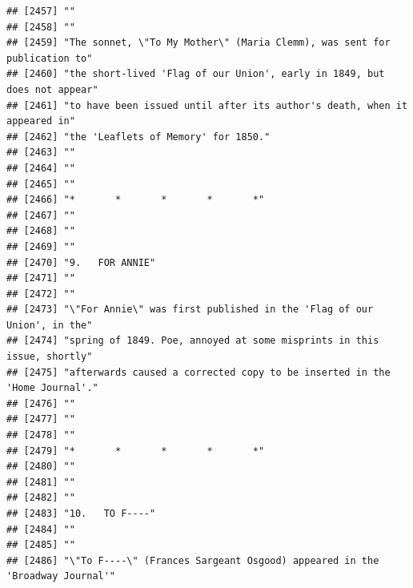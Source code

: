 \documentclass{article}\usepackage[]{graphicx}\usepackage[]{color}
\makeatletter
\newenvironment{kframe}{%
 \def\at@end@of@kframe{}%
 \ifinner\ifhmode%
  \def\at@end@of@kframe{\end{minipage}}%
  \begin{minipage}{\columnwidth}%
 \fi\fi%
 \def\FrameCommand##1{\hskip\@totalleftmargin \hskip-\fboxsep
 \colorbox{shadecolor}{##1}\hskip-\fboxsep
     \hskip-\linewidth \hskip-\@totalleftmargin \hskip\columnwidth}%
 \MakeFramed {\advance\hsize-\width
   \@totalleftmargin\z@ \linewidth\hsize
   \@setminipage}}%
 {\par\unskip\endMakeFramed%
 \at@end@of@kframe}
\newenvironment{knitrout}{}{} %
\makeatother
\begin{document}
\begin{knitrout}
\begin{kframe}
\begin{verbatim}
## [2457] ""                                                                            
## [2458] ""                                                                            
## [2459] "The sonnet, \"To My Mother\" (Maria Clemm), was sent for publication to"     
## [2460] "the short-lived 'Flag of our Union', early in 1849, but does not appear"     
## [2461] "to have been issued until after its author's death, when it appeared in"     
## [2462] "the 'Leaflets of Memory' for 1850."                                          
## [2463] ""                                                                            
## [2464] ""                                                                            
## [2465] ""                                                                            
## [2466] "*       *       *       *       *"                                           
## [2467] ""                                                                            
## [2468] ""                                                                            
## [2469] ""                                                                            
## [2470] "9.   FOR ANNIE"                                                              
## [2471] ""                                                                            
## [2472] ""                                                                            
## [2473] "\"For Annie\" was first published in the 'Flag of our Union', in the"        
## [2474] "spring of 1849. Poe, annoyed at some misprints in this issue, shortly"       
## [2475] "afterwards caused a corrected copy to be inserted in the 'Home Journal'."    
## [2476] ""                                                                            
## [2477] ""                                                                            
## [2478] ""                                                                            
## [2479] "*       *       *       *       *"                                           
## [2480] ""                                                                            
## [2481] ""                                                                            
## [2482] ""                                                                            
## [2483] "10.   TO F----"                                                              
## [2484] ""                                                                            
## [2485] ""                                                                            
## [2486] "\"To F----\" (Frances Sargeant Osgood) appeared in the 'Broadway Journal'"   

\end{verbatim}
\end{kframe}
\end{knitrout}
\end{document}
